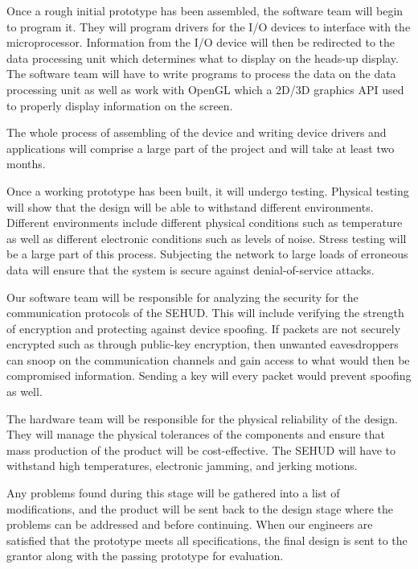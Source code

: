 Once a rough initial prototype has been assembled, the software team will
begin to program it. They will program drivers for the I/O devices to
interface with the microprocessor. Information from the I/O device will then
be redirected to the data processing unit which determines what to display on
the heads-up display. The software team will have to write programs to
process the data on the data processing unit as well as work with OpenGL
which a 2D/3D graphics API used to properly display information on the
screen.

The whole process of assembling of the device and writing device drivers and
applications will comprise a large part of the project and will take at least
two months.


Once a working prototype has been built, it will undergo testing. Physical
testing will show that the design will be able to withstand different
environments. Different environments include different physical conditions
such as temperature as well as different electronic conditions such as levels
of noise. Stress testing will be a large part of this process. Subjecting the
network to large loads of erroneous data will ensure that the system is
secure against denial-of-service attacks.

Our software team will be responsible for analyzing the security for the
communication protocols of the SEHUD. This will include verifying the
strength of encryption and protecting against device spoofing. If packets are
not securely encrypted such as through public-key encryption, then unwanted
eavesdroppers can snoop on the communication channels and gain access to what
would then be compromised information. Sending a key will every packet would
prevent spoofing as well.

The hardware team will be responsible for the physical reliability of the
design. They will manage the physical tolerances of the components and ensure
that mass production of the product will be cost-effective. The SEHUD will
have to withstand high temperatures, electronic jamming, and jerking motions.

Any problems found during this stage will be gathered into a list of
modifications, and the product will be sent back to the design stage where
the problems can be addressed and before continuing. When our engineers are
satisfied that the prototype meets all specifications, the final design is
sent to the grantor along with the passing prototype for evaluation.



